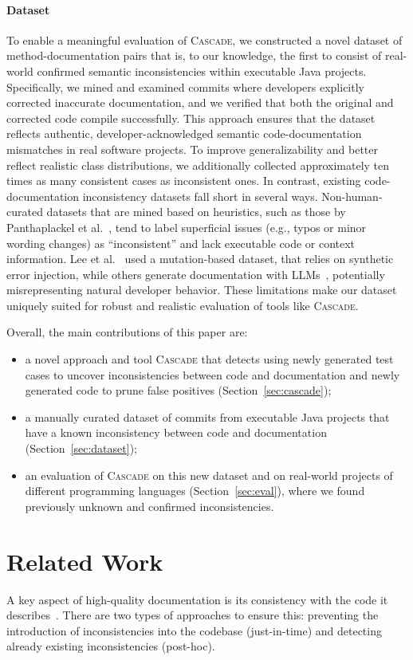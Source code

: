 \documentclass[acmsmall, screen]{acmart}
\newcommand{\tool}{\textsc{Cascade}\xspace}
\begin{document}
\paragraph*{Dataset}
To enable a meaningful evaluation of \tool, we constructed a novel dataset of method-documentation pairs that is, to our knowledge, the first to consist of real-world confirmed semantic inconsistencies within executable Java projects. Specifically, we mined and examined commits where developers explicitly corrected inaccurate documentation, and we verified that both the original and corrected code compile successfully. This approach ensures that the dataset reflects authentic, developer-acknowledged semantic code-documentation mismatches in real software projects. To improve generalizability and better reflect realistic class distributions, we additionally collected approximately ten times as many consistent cases as inconsistent ones.
In contrast, existing code-documentation inconsistency datasets fall short in several ways. Non-human-curated datasets that are mined based on heuristics, such as those by Panthaplackel et al.~\cite{panthaplackel2020learning}, tend to label superficial issues (e.g., typos or minor wording changes) as ``inconsistent'' and lack executable code or context information. Lee et 
al.~\cite{metamon} used a mutation-based dataset, that relies on synthetic error injection, while others generate documentation with LLMs~\cite{sungmin}, potentially misrepresenting natural developer behavior. These limitations make our dataset uniquely suited for robust and realistic evaluation of tools like \tool.


Overall, the main contributions of this paper are:
\begin{itemize}
    \item a novel approach and tool \tool that detects using newly generated test cases to uncover inconsistencies between code and documentation and newly generated code to prune false positives (Section~\ref{sec:cascade});
    \item a manually curated dataset of commits from executable Java projects that have a known inconsistency between code and documentation (Section~\ref{sec:dataset});
    \item an evaluation of \tool on this new dataset and on real-world projects of different programming languages (Section~\ref{sec:eval}), where we found previously unknown and confirmed inconsistencies.
\end{itemize}


\section{Related Work}\label{sec:rel}
A key aspect of high-quality documentation is its consistency with the code it describes~\cite{rani2023decade}. There are two types of approaches to ensure this: preventing the introduction of inconsistencies into the codebase (just-in-time) and detecting already existing inconsistencies (post-hoc).
\end{document}
